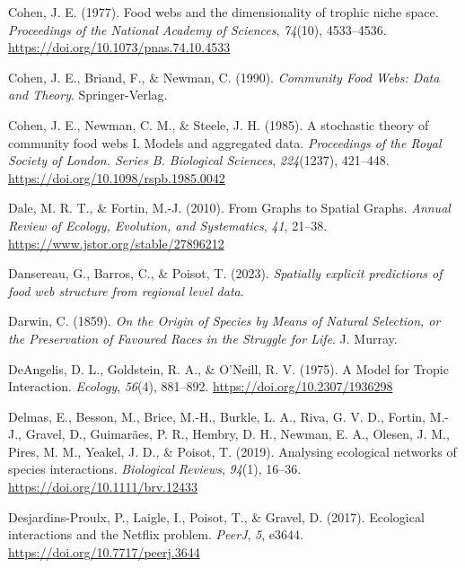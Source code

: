 \documentclass[
]{article}
\newlength{\cslhangindent}
\newenvironment{CSLReferences}[2] %
 {\begin{list}{}{%
  \setlength{\itemindent}{0pt}
  \setlength{\leftmargin}{0pt}
  \setlength{\parsep}{0pt}
  \ifodd #1
   \setlength{\leftmargin}{\cslhangindent}
   \setlength{\itemindent}{-1\cslhangindent}
  \fi
  \setlength{\itemsep}{#2\baselineskip}}}
 {\end{list}}
\begin{document}
\begin{CSLReferences}{1}{0}
Cohen, J. E. (1977). Food webs and the dimensionality of trophic niche
space. \emph{Proceedings of the National Academy of Sciences},
\emph{74}(10), 4533--4536. \url{https://doi.org/10.1073/pnas.74.10.4533}

Cohen, J. E., Briand, F., \& Newman, C. (1990). \emph{Community {Food
Webs}: {Data} and {Theory}}. Springer-Verlag.

Cohen, J. E., Newman, C. M., \& Steele, J. H. (1985). A stochastic
theory of community food webs {I}. {Models} and aggregated data.
\emph{Proceedings of the Royal Society of London. Series B. Biological
Sciences}, \emph{224}(1237), 421--448.
\url{https://doi.org/10.1098/rspb.1985.0042}

Dale, M. R. T., \& Fortin, M.-J. (2010). From {Graphs} to {Spatial
Graphs}. \emph{Annual Review of Ecology, Evolution, and Systematics},
\emph{41}, 21--38. \url{https://www.jstor.org/stable/27896212}

Dansereau, G., Barros, C., \& Poisot, T. (2023). \emph{Spatially
explicit predictions of food web structure from regional level data}.

Darwin, C. (1859). \emph{On the {Origin} of {Species} by {Means} of
{Natural Selection}, or the {Preservation} of {Favoured Races} in the
{Struggle} for {Life}}. J. Murray.

DeAngelis, D. L., Goldstein, R. A., \& O'Neill, R. V. (1975). A {Model}
for {Tropic Interaction}. \emph{Ecology}, \emph{56}(4), 881--892.
\url{https://doi.org/10.2307/1936298}

Delmas, E., Besson, M., Brice, M.-H., Burkle, L. A., Riva, G. V. D.,
Fortin, M.-J., Gravel, D., Guimarães, P. R., Hembry, D. H., Newman, E.
A., Olesen, J. M., Pires, M. M., Yeakel, J. D., \& Poisot, T. (2019).
Analysing ecological networks of species interactions. \emph{Biological
Reviews}, \emph{94}(1), 16--36. \url{https://doi.org/10.1111/brv.12433}

Desjardins-Proulx, P., Laigle, I., Poisot, T., \& Gravel, D. (2017).
Ecological interactions and the {Netflix} problem. \emph{PeerJ},
\emph{5}, e3644. \url{https://doi.org/10.7717/peerj.3644}


\end{CSLReferences}
\end{document}

